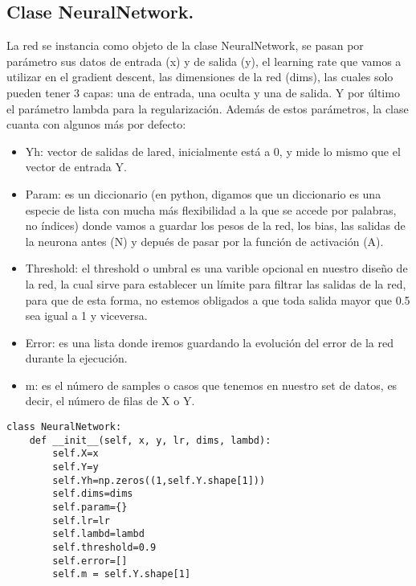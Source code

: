 \documentclass[a4paper,10pt]{article}
\begin{document}
\subsection{Clase NeuralNetwork.}
\noindent
La red se instancia como objeto de la clase NeuralNetwork, se pasan por parámetro sus datos de entrada (x) y de salida (y), el learning rate que vamos a utilizar en el gradient descent, las dimensiones de la red (dims), las cuales solo pueden tener 3 capas: una de entrada, una oculta y una de salida. Y por último el parámetro lambda para la regularización. Además de estos parámetros, la clase cuanta con algunos más por defecto:
\begin{itemize}
    \item Yh: vector de salidas de lared, inicialmente está a 0, y mide lo mismo que el vector de entrada Y.
    \item Param: es un diccionario (en python, digamos que un diccionario es una especie de lista con mucha más flexibilidad a la que se accede por palabras, no índices) donde vamos a guardar los pesos de la red, los bias, las salidas de la neurona antes (N) y depués de pasar por la función de activación (A).
    \item Threshold: el threshold o umbral es una varible opcional en nuestro diseño de la red, la cual sirve para establecer un límite para filtrar las salidas de la red, para que de esta forma, no estemos obligados a que toda salida mayor que 0.5 sea igual a 1 y viceversa.
    \item Error: es una lista donde iremos guardando la evolución del error de la red durante la ejecución.
    \item m: es el número de samples o casos que tenemos en nuestro set de datos, es decir, el número de filas de X o Y.
\end{itemize}
\begin{lstlisting}
class NeuralNetwork:
    def __init__(self, x, y, lr, dims, lambd):
        self.X=x
        self.Y=y
        self.Yh=np.zeros((1,self.Y.shape[1]))
        self.dims=dims
        self.param={}
        self.lr=lr
        self.lambd=lambd
        self.threshold=0.9
        self.error=[]
        self.m = self.Y.shape[1]
\end{lstlisting}
\end{document}
